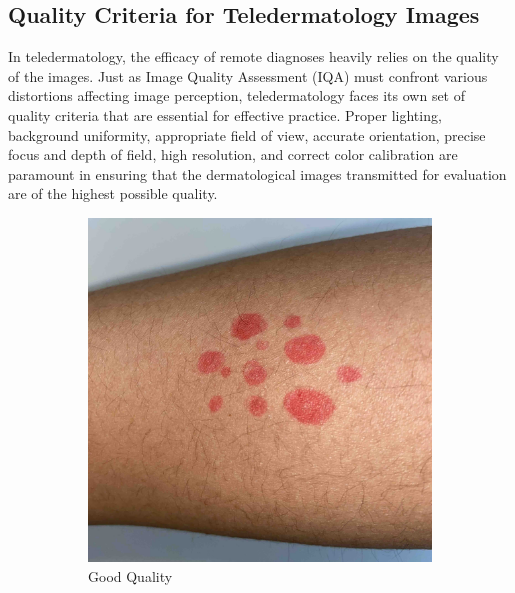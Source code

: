 \subsection{Quality Criteria for Teledermatology Images}
\label{sub:QualityCriteriaTeledermatology}
In teledermatology, the efficacy of remote diagnoses heavily relies on the quality of the images. Just as Image Quality Assessment (IQA) must confront various distortions affecting image perception, teledermatology faces its own set of quality criteria that are essential for effective practice. Proper lighting, background uniformity, appropriate field of view, accurate orientation, precise focus and depth of field, high resolution, and correct color calibration are paramount in ensuring that the dermatological images transmitted for evaluation are of the highest possible quality.
\begin{figure}[ht]
    \centering
    \begin{subfigure}[b]{0.24\textwidth}
        \includegraphics[width=\textwidth]{img/Reference.jpg}
        \caption{Good Quality}
    \end{subfigure}
    \hfill
    \begin{subfigure}[b]{0.24\textwidth}

\end{subfigure}
\end{figure}
